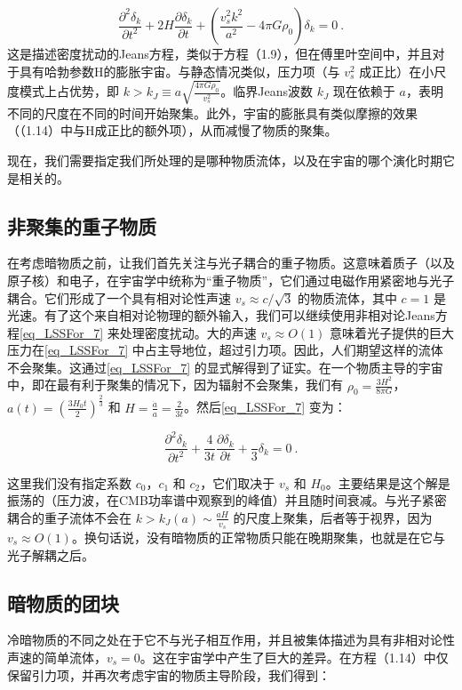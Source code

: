 \begin{equation}\label{eq_LSSFor_7} \frac{\partial^2 \delta_k}{\partial t^2} + 2H \frac{\partial \delta_k}{\partial t} + \left( \frac{v_s^2 k^2}{a^2} - 4\pi G\rho_0 \right) \delta_k = 0~. 
\end{equation}
这是描述密度扰动的Jeans方程，类似于方程（1.9），但在傅里叶空间中，并且对于具有哈勃参数H的膨胀宇宙。与静态情况类似，压力项（与 \( v_s^2 \) 成正比）在小尺度模式上占优势，即 \( k > k_J \equiv a \sqrt{\frac{4\pi G\rho_0}{v_s^2}} \)。临界Jeans波数 \( k_J \) 现在依赖于 \( a \)，表明不同的尺度在不同的时间开始聚集。此外，宇宙的膨胀具有类似摩擦的效果（（1.14）中与H成正比的额外项），从而减慢了物质的聚集。

现在，我们需要指定我们所处理的是哪种物质流体，以及在宇宙的哪个演化时期它是相关的。

\subsection{非聚集的重子物质}

在考虑暗物质之前，让我们首先关注与光子耦合的重子物质。这意味着质子（以及原子核）和电子，在宇宙学中统称为“重子物质”，它们通过电磁作用紧密地与光子耦合。它们形成了一个具有相对论性声速 \( v_s \approx c/\sqrt{3} \) 的物质流体，其中 \( c = 1 \) 是光速。有了这个来自相对论物理的额外输入，我们可以继续使用非相对论Jeans方程\autoref{eq_LSSFor_7} 来处理密度扰动。大的声速 \( v_s \approx O(1) \) 意味着光子提供的巨大压力在\autoref{eq_LSSFor_7} 中占主导地位，超过引力项。因此，人们期望这样的流体不会聚集。这通过\autoref{eq_LSSFor_7} 的显式解得到了证实。在一个物质主导的宇宙中，即在最有利于聚集的情况下，因为辐射不会聚集，我们有 \( \rho_0 = \frac{3H^2}{8\pi G} \)，\( a(t) = \left(\frac{3H_0 t}{2}\right)^{\frac{2}{3}} \) 和 \( H = \frac{\dot{a}}{a} = \frac{2}{3t} \)。然后\autoref{eq_LSSFor_7} 变为：

\[ \frac{\partial^2 \delta_k}{\partial t^2} + \frac{4}{3t} \frac{\partial \delta_k}{\partial t} + \frac{}{3} \delta_k = 0 ~. \]

这里我们没有指定系数 \( c_0 \)，\( c_1 \) 和 \( c_2 \)，它们取决于 \( v_s \) 和 \( H_0 \)。主要结果是这个解是振荡的（压力波，在CMB功率谱中观察到的峰值）并且随时间衰减。与光子紧密耦合的重子流体不会在 \( k > k_J(a) \sim \frac{aH}{v_s} \) 的尺度上聚集，后者等于视界，因为 \( v_s \approx O(1) \)。换句话说，没有暗物质的正常物质只能在晚期聚集，也就是在它与光子解耦之后。

\subsection{暗物质的团块}
冷暗物质的不同之处在于它不与光子相互作用，并且被集体描述为具有非相对论性声速的简单流体，\( v_s = 0 \)。这在宇宙学中产生了巨大的差异。在方程（1.14）中仅保留引力项，并再次考虑宇宙的物质主导阶段，我们得到：

